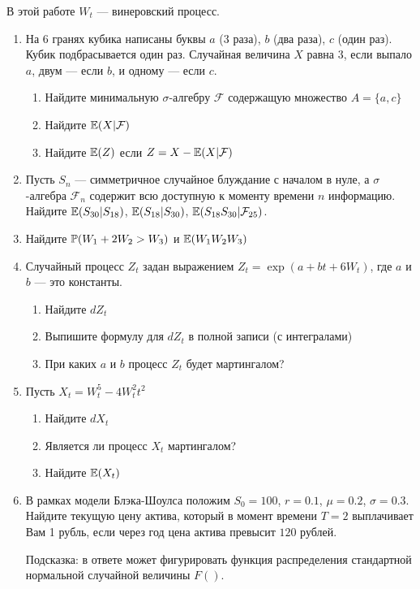 \documentclass[pdftex,12pt,a4paper]{article}
\begin{document}
В этой работе $W_t$ --- винеровский процесс.


\begin{enumerate}
\item На 6 гранях кубика написаны буквы $a$ (3 раза), $b$ (два раза), $c$ (один раз). Кубик подбрасывается один раз. Случайная величина $X$ равна 3, если выпало $a$, двум --- если $b$, и одному --- если $c$.
\begin{enumerate}
\item Найдите минимальную $\sigma$-алгебру $\mathcal{F}$ содержащую множество $A=\{a, c\}$
\item Найдите $\E(X|\mathcal{F})$
\item Найдите $\E(Z)$ если $Z = X - \E(X|\mathcal{F})$
\end{enumerate}


\item Пусть $S_n$ --- симметричное случайное блуждание с началом в нуле, а $\sigma$-алгебра $\mathcal{F}_n$ содержит всю доступную к моменту времени $n$ информацию. Найдите $\E(S_{30}|S_{18})$, $\E(S_{18}|S_{30})$, $\E(S_{18} S_{30} | \mathcal{F}_{25})$.


\item Найдите $\P(W_1 + 2W_2 > W_3)$ и $\E(W_1 W_2 W_3)$ 

\item Случайный процесс $Z_t$ задан выражением $Z_t=\exp(a+bt+6W_t)$, где $a$ и $b$ --- это константы. 
\begin{enumerate}
\item Найдите $dZ_t$
\item Выпишите формулу для $dZ_t$ в полной записи (с интегралами)
\item При каких $a$ и $b$ процесс $Z_t$ будет мартингалом?
\end{enumerate}


\item Пусть $X_t=W_t^5-4W_t^2 t^2$
\begin{enumerate}
\item Найдите $dX_t$
\item Является ли процесс $X_t$ мартингалом?
\item Найдите $\E(X_t)$
\end{enumerate}


\item  В рамках модели Блэка-Шоулса положим $S_0=100$, $r=0.1$, $\mu=0.2$, $\sigma=0.3$. Найдите текущую цену актива, который в момент времени $T=2$ выплачивает Вам 1 рубль, если через год цена актива превысит $120$ рублей.

Подсказка: в ответе может фигурировать функция распределения стандартной нормальной случайной величины $F()$.




\end{enumerate}
\end{document}
